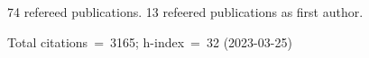 74 refereed publications. 13 refeered publications as first author.

Total citations~=~3165; h-index~=~32 (2023-03-25)